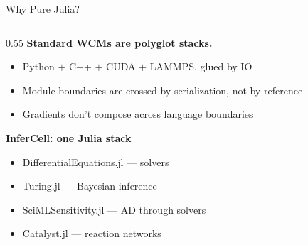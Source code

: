 \documentclass[aspectratio=169]{beamer}
\begin{document}
\begin{frame}{Why Pure Julia?}
	\begin{columns}[T]
		\begin{column}{0.55\textwidth}
			\textbf{Standard WCMs are polyglot stacks.}
			\begin{itemize}\itemsep5pt
				\item Python $+$ C++ $+$ CUDA $+$ LAMMPS, glued by IO
				\item Module boundaries are crossed by serialization, not by reference
				\item Gradients don't compose across language boundaries
			\end{itemize}
			
						\textbf{\footnotesize InferCell: one Julia stack}
			\begin{itemize}\itemsep1pt\footnotesize
				\item DifferentialEquations.jl --- solvers
				\item Turing.jl --- Bayesian inference
				\item SciMLSensitivity.jl --- AD through solvers
				\item Catalyst.jl --- reaction networks
			\end{itemize}
			

\end{column}
\end{columns}
\end{frame}
\end{document}
